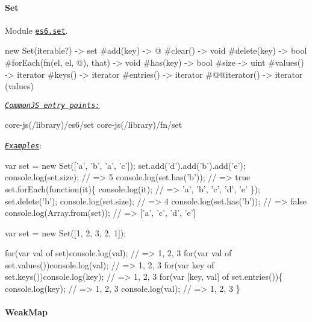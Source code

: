  \paragraph*{Set}

Module \href{https://github.com/zloirock/core-js/blob/v2.6.0/modules/es6.set.js}{\tt {\ttfamily es6.\+set}}. 
\begin{DoxyCode}
new Set(iterable?)              -> set
  #add(key)                     -> @
  #clear()                      -> void
  #delete(key)                  -> bool
  #forEach(fn(el, el, @), that) -> void
  #has(key)                     -> bool
  #size                         -> uint
  #values()                     -> iterator
  #keys()                       -> iterator
  #entries()                    -> iterator
  #@@iterator()                 -> iterator (values)
\end{DoxyCode}
 \href{#commonjs}{\tt {\itshape Common\+JS entry points\+:}} 
\begin{DoxyCode}
core-js(/library)/es6/set
core-js(/library)/fn/set
\end{DoxyCode}
 \href{http://goo.gl/bmhLwg}{\tt {\itshape Examples}}\+: 
\begin{DoxyCode}
var set = new Set(['a', 'b', 'a', 'c']);
set.add('d').add('b').add('e');
console.log(set.size);        // => 5
console.log(set.has('b'));    // => true
set.forEach(function(it)\{
  console.log(it);            // => 'a', 'b', 'c', 'd', 'e'
\});
set.delete('b');
console.log(set.size);        // => 4
console.log(set.has('b'));    // => false
console.log(Array.from(set)); // => ['a', 'c', 'd', 'e']

var set = new Set([1, 2, 3, 2, 1]);

for(var val of set)console.log(val);          // => 1, 2, 3
for(var val of set.values())console.log(val); // => 1, 2, 3
for(var key of set.keys())console.log(key);   // => 1, 2, 3
for(var [key, val] of set.entries())\{
  console.log(key);                           // => 1, 2, 3
  console.log(val);                           // => 1, 2, 3
\}
\end{DoxyCode}
 \paragraph*{Weak\+Map}

